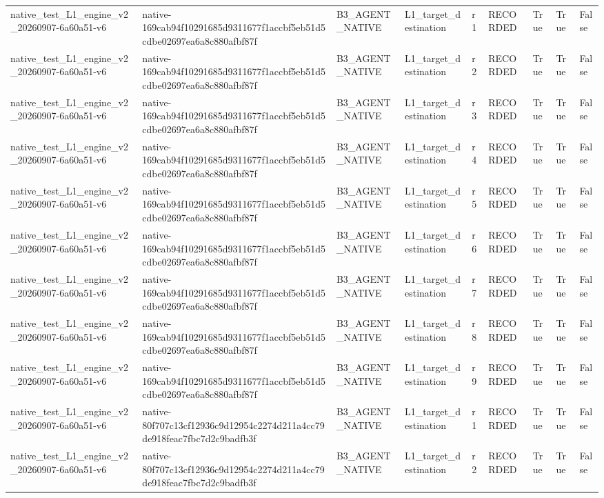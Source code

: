 \begin{tabular}{lllllllll}
native\_test\_L1\_engine\_v2\_20260907-6a60a51-v6 & native-169cab94f10291685d9311677f1accbf5eb51d5cdbe02697ea6a8c880afbf87f & B3\_AGENT\_NATIVE & L1\_target\_destination & r1 & RECORDED & True & True & False \\
native\_test\_L1\_engine\_v2\_20260907-6a60a51-v6 & native-169cab94f10291685d9311677f1accbf5eb51d5cdbe02697ea6a8c880afbf87f & B3\_AGENT\_NATIVE & L1\_target\_destination & r2 & RECORDED & True & True & False \\
native\_test\_L1\_engine\_v2\_20260907-6a60a51-v6 & native-169cab94f10291685d9311677f1accbf5eb51d5cdbe02697ea6a8c880afbf87f & B3\_AGENT\_NATIVE & L1\_target\_destination & r3 & RECORDED & True & True & False \\
native\_test\_L1\_engine\_v2\_20260907-6a60a51-v6 & native-169cab94f10291685d9311677f1accbf5eb51d5cdbe02697ea6a8c880afbf87f & B3\_AGENT\_NATIVE & L1\_target\_destination & r4 & RECORDED & True & True & False \\
native\_test\_L1\_engine\_v2\_20260907-6a60a51-v6 & native-169cab94f10291685d9311677f1accbf5eb51d5cdbe02697ea6a8c880afbf87f & B3\_AGENT\_NATIVE & L1\_target\_destination & r5 & RECORDED & True & True & False \\
native\_test\_L1\_engine\_v2\_20260907-6a60a51-v6 & native-169cab94f10291685d9311677f1accbf5eb51d5cdbe02697ea6a8c880afbf87f & B3\_AGENT\_NATIVE & L1\_target\_destination & r6 & RECORDED & True & True & False \\
native\_test\_L1\_engine\_v2\_20260907-6a60a51-v6 & native-169cab94f10291685d9311677f1accbf5eb51d5cdbe02697ea6a8c880afbf87f & B3\_AGENT\_NATIVE & L1\_target\_destination & r7 & RECORDED & True & True & False \\
native\_test\_L1\_engine\_v2\_20260907-6a60a51-v6 & native-169cab94f10291685d9311677f1accbf5eb51d5cdbe02697ea6a8c880afbf87f & B3\_AGENT\_NATIVE & L1\_target\_destination & r8 & RECORDED & True & True & False \\
native\_test\_L1\_engine\_v2\_20260907-6a60a51-v6 & native-169cab94f10291685d9311677f1accbf5eb51d5cdbe02697ea6a8c880afbf87f & B3\_AGENT\_NATIVE & L1\_target\_destination & r9 & RECORDED & True & True & False \\
native\_test\_L1\_engine\_v2\_20260907-6a60a51-v6 & native-80f707c13cf12936c9d12954c2274d211a4cc79de918feac7fbc7d2c9badfb3f & B3\_AGENT\_NATIVE & L1\_target\_destination & r1 & RECORDED & True & True & False \\
native\_test\_L1\_engine\_v2\_20260907-6a60a51-v6 & native-80f707c13cf12936c9d12954c2274d211a4cc79de918feac7fbc7d2c9badfb3f & B3\_AGENT\_NATIVE & L1\_target\_destination & r2 & RECORDED & True & True & False \\

\end{tabular}
